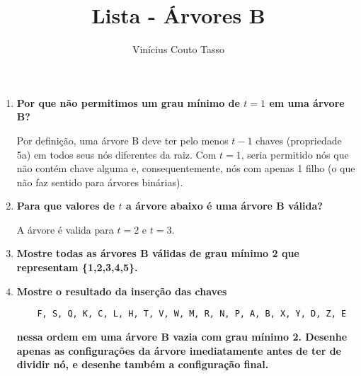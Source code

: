 \documentclass{article}
\title{Lista - Árvores B}
\author{Vinícius Couto Tasso}
\date{}
\begin{document}
\maketitle
{}
         
\begin{enumerate}

\item \textbf{Por que não permitimos um grau mínimo de $t = 1$ em uma árvore B?}

Por definição, uma árvore B deve ter pelo menos $t - 1$ chaves (propriedade 5a) em todos seus nós diferentes da raiz. Com $t = 1$, seria permitido nós que não contém chave alguma e, consequentemente, nós com apenas 1 filho (o que não faz sentido para árvores binárias).

\item \textbf{Para que valores de $t$ a árvore abaixo é uma árvore B válida?}

A árvore é valida para $t = 2$ e $t = 3$.

\item \textbf{Mostre todas as árvores B válidas de grau mínimo 2 que representam \{1,2,3,4,5\}.}



\item \textbf{Mostre o resultado da inserção das chaves}

\begin{verbatim}
    F, S, Q, K, C, L, H, T, V, W, M, R, N, P, A, B, X, Y, D, Z, E
\end{verbatim}
\textbf{nessa ordem em uma árvore B vazia com grau mínimo 2. Desenhe apenas as configurações da árvore imediatamente antes de ter de dividir nó, e desenhe também a configuração final.}



\end{enumerate}
\end{document}
